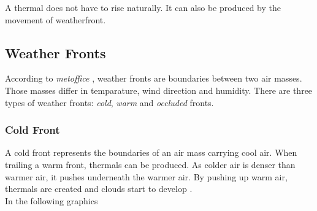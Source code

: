 \noindent
A \gls{thermal} does not have to rise naturally. It can also be produced by the movement of \gls{weatherfront}.

\clearpage

\subsection{Weather Fronts}
According to \emph{metoffice} \cite{metoffice:weatherfronts}, weather fronts are boundaries between two air masses. Those masses differ in temparature, wind direction and humidity.
There are three types of weather fronts: \emph{cold}, \emph{warm} and \emph{occluded} fronts.

\subsubsection{Cold Front}
A cold front represents the boundaries of an air mass carrying cool air. When trailing a warm front, \gls{thermal}s can be produced.
As colder air is denser than warmer air, it pushes underneath the warmer air.
By pushing up warm air, \gls{thermal}s are created and clouds start to develop \cite{ww2010:coldfront}.
\\
In the following graphics

